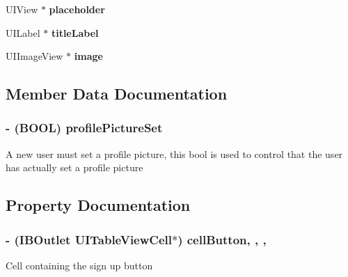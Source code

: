 \begin{DoxyCompactItemize}
\item 
\hypertarget{category_e_s_register_view_07_08_abe328df18e60c579778f068a8f915167}{}U\+I\+View $\ast$ {\bfseries placeholder}\label{category_e_s_register_view_07_08_abe328df18e60c579778f068a8f915167}

\item 
\hypertarget{category_e_s_register_view_07_08_ade0c70633a57b94f1c629bb661941496}{}U\+I\+Label $\ast$ {\bfseries title\+Label}\label{category_e_s_register_view_07_08_ade0c70633a57b94f1c629bb661941496}

\item 
\hypertarget{category_e_s_register_view_07_08_abe899f5552d3d50d6e2dc80de06082d4}{}U\+I\+Image\+View $\ast$ {\bfseries image}\label{category_e_s_register_view_07_08_abe899f5552d3d50d6e2dc80de06082d4}

\end{DoxyCompactItemize}


\subsection{Member Data Documentation}
\hypertarget{category_e_s_register_view_07_08_a5e650ac6588badca3144b5ce0ed3ec54}{}
\subsubsection[{profile\+Picture\+Set}]{\setlength{\rightskip}{0pt plus 5cm}-\/ (B\+O\+O\+L) profile\+Picture\+Set\hspace{0.3cm}{\ttfamily [protected]}}\label{category_e_s_register_view_07_08_a5e650ac6588badca3144b5ce0ed3ec54}
A new user must set a profile picture, this bool is used to control that the user has actually set a profile picture 

\subsection{Property Documentation}
\hypertarget{category_e_s_register_view_07_08_a25d21fc70664cbcfa522a995545357f3}{}
\subsubsection[{cell\+Button}]{\setlength{\rightskip}{0pt plus 5cm}-\/ (I\+B\+Outlet U\+I\+Table\+View\+Cell$\ast$) cell\+Button\hspace{0.3cm}{\ttfamily [read]}, {\ttfamily [write]}, {\ttfamily [nonatomic]}, {\ttfamily [strong]}}\label{category_e_s_register_view_07_08_a25d21fc70664cbcfa522a995545357f3}
Cell containing the sign up button \hypertarget{category_e_s_register_view_07_08_ac66f6acb48873fb10a77c519fca9c2d3}{}
